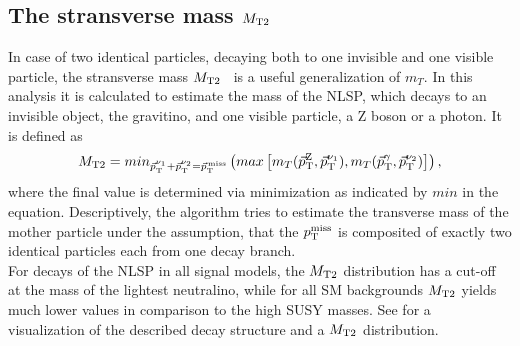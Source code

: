 \subsection*{The stransverse mass $M_{\mathrm{T2}}$}
In case of two identical particles, decaying both to one invisible and one visible particle, the stransverse mass $M_{\mathrm{T2}}$~\cite{Mt2_1,Mt2_2} is a useful generalization of $m_T$. In this analysis it is calculated to estimate the mass of the NLSP, which decays to an invisible object, the gravitino, and one visible particle, a Z boson or a photon. It is defined as
\begin{equation}
 M_{\mathrm{T2}} = min_{{\vec p}_{\mathrm{T}}^{\nu_1}+{\vec p}_{\mathrm{T}}^{\nu_2}={\vec p}_{\mathrm{T}}^{\kern1pt\text{miss}}}\left(max\left[m_T({\vec p}_{\mathrm{T}}^{\mathrm{Z}},{\vec p}_{\mathrm{T}}^{\nu_1}),m_T({\vec p}_{\mathrm{T}}^{\gamma},{\vec p}_{\mathrm{T}}^{\nu_2})\right]\right),
\end{equation}
where the final value is determined via minimization as indicated by $min$ in the equation. Descriptively, the algorithm tries to estimate the transverse mass of the mother particle under the assumption, that the $p_{\mathrm{T}}^\text{miss}$ is composited of exactly two identical particles each from one decay branch.\\
For decays of the NLSP in all signal models, the $M_{\mathrm{T2}}$ distribution has a cut-off at the mass of the lightest neutralino, while for all SM backgrounds $M_{\mathrm{T2}}$ yields much lower values in comparison to the high SUSY masses. See  for a visualization of the described decay structure and a $M_{\mathrm{T2}}$ distribution.

